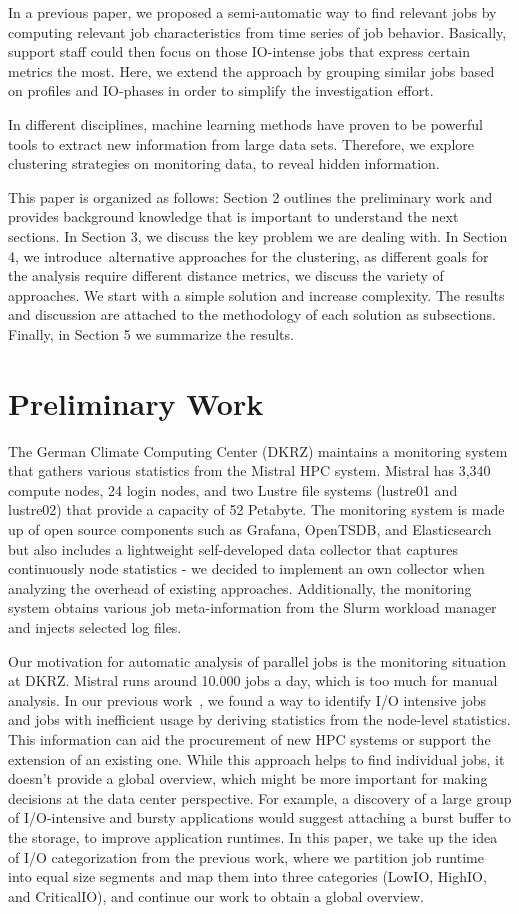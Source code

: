\documentclass[]{llncs}
\begin{document}
In a previous paper, we proposed a semi-automatic way to find relevant jobs by computing relevant job characteristics from time series of job behavior.
Basically, support staff could then focus on those IO-intense jobs that express certain metrics the most.
Here, we extend the approach by grouping similar jobs based on profiles and IO-phases in order to simplify the investigation effort.

In different disciplines, machine learning methods have proven to be powerful tools to extract new information from large data sets.
Therefore, we explore clustering strategies on monitoring data, to reveal hidden information.

This paper is organized as follows: Section 2 outlines the preliminary work and provides background knowledge that is important to understand the next sections.
In Section 3, we discuss the key problem we are dealing with.
In Section 4, we introduce\ alternative approaches for the clustering, as different goals for the analysis require different distance metrics, we discuss the variety of approaches.
We start with a simple solution and increase complexity.
The results and discussion are attached to the methodology of each solution as subsections.
Finally, in Section 5 we summarize the results.


\section{Preliminary Work}
The German Climate Computing Center (DKRZ) maintains a monitoring system that gathers various statistics from the Mistral HPC system.
Mistral has 3,340 compute nodes, 24 login nodes, and two Lustre file systems (lustre01 and lustre02) that provide a capacity of 52 Petabyte.
The monitoring system is made up of open source components such as Grafana, OpenTSDB, and Elasticsearch but also includes a lightweight self-developed data collector that captures continuously node statistics - we decided to implement an own collector when analyzing the overhead of existing approaches.
Additionally, the monitoring system obtains various job meta-information from the Slurm workload manager and injects selected log files.

Our motivation for automatic analysis of parallel jobs is the monitoring situation at DKRZ.
Mistral runs around 10.000 jobs a day, which is too much for manual analysis.
In our previous work~\cite{iocats2020}, we found a way to identify I/O intensive jobs and jobs with inefficient usage by deriving statistics from the node-level statistics.
This information can aid the procurement of new HPC systems or support the extension of an existing one.
While this approach helps to find individual jobs, it doesn't provide a global overview, which might be more important for making decisions at the data center perspective.
For example, a discovery of a large group of I/O-intensive and bursty applications would suggest attaching a burst buffer to the storage, to improve application runtimes.
In this paper, we take up the idea of I/O categorization from the previous work, where we partition job runtime into equal size segments and map them into three categories (LowIO, HighIO, and CriticalIO), and continue our work to obtain a global overview.
\end{document}
